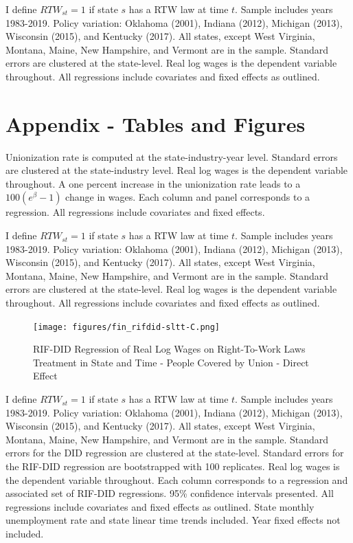 \documentclass[11pt]{article}
\begin{document}
{\pagebreak
\begin{landscape}
\small{}
\footnotesize{I define $RTW_{st} = 1$ if state $s$ has a RTW law at time $t$. Sample includes years 1983-2019. Policy variation: Oklahoma (2001), Indiana (2012), Michigan (2013), Wisconsin (2015), and Kentucky (2017). All states, except West Virginia, Montana, Maine, New Hampshire, and Vermont are in the sample. Standard errors are clustered at the state-level. Real log wages is the dependent variable throughout. All regressions include covariates and fixed effects as outlined.}
\end{landscape}

\pagebreak
\section{Appendix - Tables and Figures}
\small{}
\footnotesize{Unionization rate is computed at the state-industry-year level. Standard errors are clustered at the state-industry level. Real log wages is the dependent variable throughout. A one percent increase in the unionization rate leads to a $100(e^{\beta} - 1)$ change in wages. Each column and panel corresponds to a regression. All regressions include covariates and fixed effects.}

\pagebreak
\begin{landscape}
\small{}
\footnotesize{I define $RTW_{st} = 1$ if state $s$ has a RTW law at time $t$. Sample includes years 1983-2019. Policy variation: Oklahoma (2001), Indiana (2012), Michigan (2013), Wisconsin (2015), and Kentucky (2017). All states, except West Virginia, Montana, Maine, New Hampshire, and Vermont are in the sample. Standard errors are clustered at the state-level. Real log wages is the dependent variable throughout. All regressions include covariates and fixed effects as outlined.}
\end{landscape}

\pagebreak
\begin{landscape}
\begin{figure}[ht!]
\centering
    \caption{RIF-DID Regression of Real Log Wages on Right-To-Work Laws Treatment in State and Time - People Covered by Union - Direct Effect}\label{fig:rifdid-sltt-C}
    \texttt{[image: figures/fin\_rifdid-sltt-C.png]}
\end{figure}
\footnotesize{I define $RTW_{st} = 1$ if state $s$ has a RTW law at time $t$. Sample includes years 1983-2019. Policy variation: Oklahoma (2001), Indiana (2012), Michigan (2013), Wisconsin (2015), and Kentucky (2017). All states, except West Virginia, Montana, Maine, New Hampshire, and Vermont are in the sample. Standard errors for the DID regression are clustered at the state-level. Standard errors for the RIF-DID regression are bootstrapped with 100 replicates. Real log wages is the dependent variable throughout. Each column corresponds to a regression and associated set of RIF-DID regressions. 95\% confidence intervals presented. All regressions include covariates and fixed effects as outlined. State monthly unemployment rate and state linear time trends included. Year fixed effects not included.}
\end{landscape}

}
\end{document}

